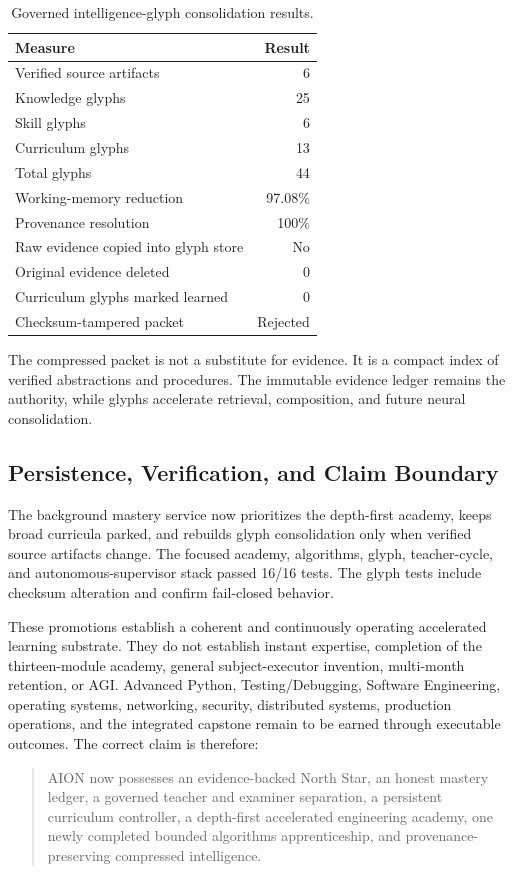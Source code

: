 \begin{table}[htbp]
\centering
\caption{Governed intelligence-glyph consolidation results.}
\label{tab:intelligence-glyph-results}
\begin{tabular}{@{}lr@{}}
\toprule
Measure & Result \\
\midrule
Verified source artifacts & 6 \\
Knowledge glyphs & 25 \\
Skill glyphs & 6 \\
Curriculum glyphs & 13 \\
Total glyphs & 44 \\
Working-memory reduction & 97.08\% \\
Provenance resolution & 100\% \\
Raw evidence copied into glyph store & No \\
Original evidence deleted & 0 \\
Curriculum glyphs marked learned & 0 \\
Checksum-tampered packet & Rejected \\
\bottomrule
\end{tabular}
\end{table}

The compressed packet is not a substitute for evidence.  It is a compact index
of verified abstractions and procedures.  The immutable evidence ledger remains
the authority, while glyphs accelerate retrieval, composition, and future
neural consolidation.

\subsection{Persistence, Verification, and Claim Boundary}
\label{subsec:academy-glyph-persistence-boundary}

The background mastery service now prioritizes the depth-first academy, keeps
broad curricula parked, and rebuilds glyph consolidation only when verified
source artifacts change.  The focused academy, algorithms, glyph,
teacher-cycle, and autonomous-supervisor stack passed 16/16 tests.  The glyph
tests include checksum alteration and confirm fail-closed behavior.

These promotions establish a coherent and continuously operating accelerated
learning substrate.  They do not establish instant expertise, completion of
the thirteen-module academy, general subject-executor invention, multi-month
retention, or AGI.  Advanced Python, Testing/Debugging, Software Engineering,
operating systems, networking, security, distributed systems, production
operations, and the integrated capstone remain to be earned through executable
outcomes.  The correct claim is therefore:
\begin{quote}
AION now possesses an evidence-backed North Star, an honest mastery ledger, a
governed teacher and examiner separation, a persistent curriculum controller,
a depth-first accelerated engineering academy, one newly completed bounded
algorithms apprenticeship, and provenance-preserving compressed intelligence.
\end{quote}
